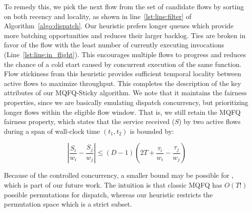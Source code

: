 To remedy this, we pick the next flow from the set of candidate flows by sorting on both recency and locality, as shown in line~\ref{lst:line:filter} of Algorithm~\ref{algo:dispatch}.
Our heuristic prefers longer queues which provide more batching opportunities and reduces their larger backlog.
Ties are broken in favor of the flow with the least number of currently executing invocations (Line~\ref{lst:line:in_flight}).
This encourages multiple flows to progress and reduces the chance of a cold start caused by concurrent execution of the same function.
Flow stickiness from this heuristic provides sufficient temporal locality between active flows to maximize throughput.
This completes the description of the key attributes of our MQFQ-Sticky algorithm.
We note that it maintains the fairness properties, since we are basically emulating dispatch concurrency, but prioritizing longer flows within the eligible flow window.
That is, we still retain the MQFQ fairness property, which states that the service received ($S$) by two active flows during a span of wall-clock time $(t_1, t_2)$ is bounded by:

\begin{equation}
  \label{eq:fairness}
 \left|\dfrac{S_i}{w_i} - \dfrac{S_j}{w_j} \right| \leq (D-1) \left(2T + \dfrac{\tau_i}{w_i} -\dfrac{\tau_j}{w_j} \right)
\end{equation}

Because of the controlled concurrency, a smaller bound may be possible for \QName, which is part of our future work. 
The intuition is that classic MQFQ has $O(T!)$ possible permutations for dispatch, whereas our heuristic restricts the permutation space which is a strict subset. 


